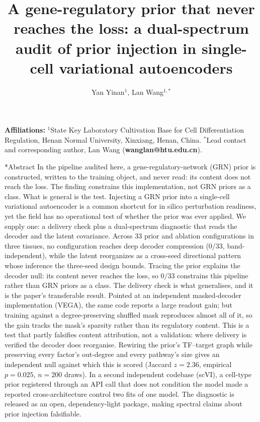 \documentclass[11pt,a4paper]{article}
\title{\textbf{A gene-regulatory prior that never reaches the loss: a dual-spectrum audit of prior injection in single-cell variational autoencoders}}
\author{Yan Yinan$^{1}$, Lan Wang$^{1,*}$}
\date{}
\makeatletter
\renewcommand{\section}{\@startsection{section}{1}{0pt}{12pt plus 6pt}{6pt}{\large\bfseries}}
\makeatother
\begin{document}
\maketitle

\textbf{Affiliations:}
$^{1}$State Key Laboratory Cultivation Base for Cell Differentiation Regulation, Henan Normal University, Xinxiang, Henan, China.
$^{*}$Lead contact and corresponding author, Lan Wang (\textbf{wanglan@htu.edu.cn}).

\section*{Abstract}
In the pipeline audited here, a gene-regulatory-network (GRN) prior is constructed, written to
the training object, and never read: its content does not reach the loss. The finding constrains
this implementation, not GRN priors as a class. What is general is the test. Injecting a GRN prior
into a single-cell variational autoencoder is a common shortcut for in silico perturbation
readiness, yet the field has no operational test of whether the prior was ever applied. We supply one: a delivery check plus a
dual-spectrum diagnostic that reads the decoder and the latent covariance. Across 33 prior and
ablation configurations in three tissues, no configuration reaches deep decoder compression
($0/33$, band-independent), while the latent reorganizes as a cross-seed directional pattern whose
inference the three-seed design bounds. Tracing the prior explains the decoder null: its content never reaches the loss, so $0/33$
constrains this pipeline rather than GRN priors as a class. The delivery check is what
generalises, and it is the paper's transferable result. Pointed at an independent
masked-decoder implementation (VEGA), the same code reports a large readout gain; but training
against a degree-preserving shuffled mask reproduces almost all of it, so the gain tracks the
mask's sparsity rather than its regulatory content. This is a test that partly falsifies
content attribution, not a validation: where delivery is verified the decoder does reorganise. Rewiring the prior's TF--target graph while preserving every factor's out-degree and every pathway's size gives an independent null against which this is scored (Jaccard $z=2.36$, empirical $p=0.025$, $n=200$ draws). In a second independent codebase (scVI), a
cell-type prior registered through an API call that does not condition the model made a reported
cross-architecture control two fits of one model. The diagnostic is released as an open,
dependency-light package, making spectral claims about prior injection falsifiable.
\end{document}
